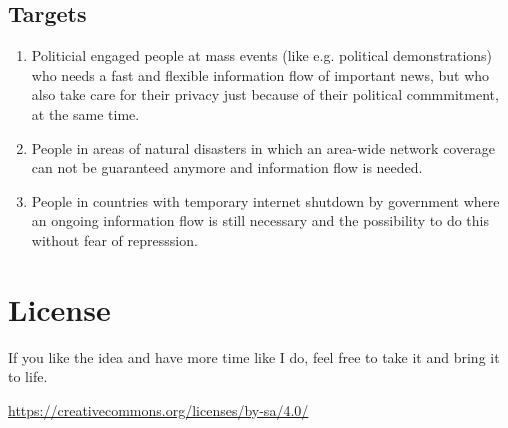\documentclass{article}
\newtheorem*{theorem A}{Theorem A}
\newtheorem*{theorem B}{N\"olker's Theorem}
\theoremstyle{remark}
\theoremstyle{remark}
\begin{document}
\subsection{Targets}
\label{ss:targets}
\begin{enumerate}
    \item Politicial engaged people at mass events (like e.g. political demonstrations) who needs a fast and flexible information flow of important news, but who also take care for their privacy just because of their political commmitment, at the same time.
    \item People in areas of natural disasters in which an area-wide network coverage can not be guaranteed anymore and information flow is needed.
    \item People in countries with temporary internet shutdown by government where an ongoing information flow is still necessary and the possibility to do this without fear of represssion.
\end{enumerate}
%
%
%

%
%
\section*{License}
\label{s:license}
If you like the idea and have more time like I do, feel free to take it and bring it to life. \Cooley
\begin{center}
	\url{https://creativecommons.org/licenses/by-sa/4.0/}
\end{center}
\end{document}
